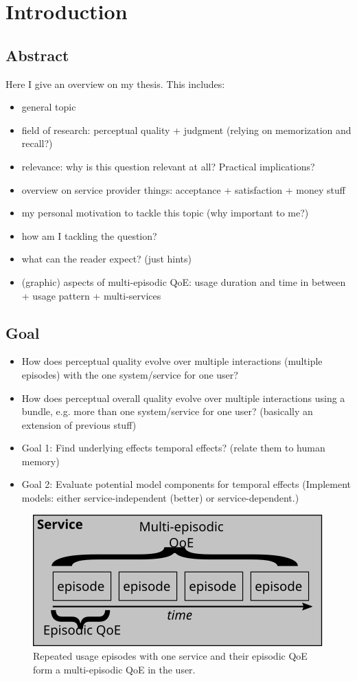 \chapter{Introduction}
\section*{Abstract}
Here I give an overview on my thesis.
This includes:
\begin{itemize}
\item general topic
\item field of research: perceptual quality + judgment (relying on memorization and recall?)
\item relevance: why is this question relevant at all? Practical implications?
\item overview on service provider things: acceptance + satisfaction + money stuff
\item my personal motivation to tackle this topic (why important to me?)
\item how am I tackling the question?
\item what can the reader expect? (just hints)
\item (graphic) aspects of multi-episodic QoE: usage duration and time in between + usage pattern + multi-services
\end{itemize}

\section{Goal}
\begin{itemize}
\item How does perceptual quality evolve over multiple interactions (multiple episodes) with the one system/service for one user?
\item How does perceptual overall quality evolve over multiple interactions using a bundle, e.g. more than one system/service for one user? (basically an extension of previous stuff)
\item Goal 1: Find underlying effects temporal effects? (relate them to human memory)
\item Goal 2: Evaluate potential model components for temporal effects (Implement models: either service-independent (better) or service-dependent.)
\end{itemize}

\begin{figure}
	\centering
	\includegraphics{fig/multi-episodic}
	\caption{Repeated usage episodes with one service and their episodic QoE form a multi-episodic QoE in the user.}
	\label{chap10:img:multiEpisodic}
\end{figure}

